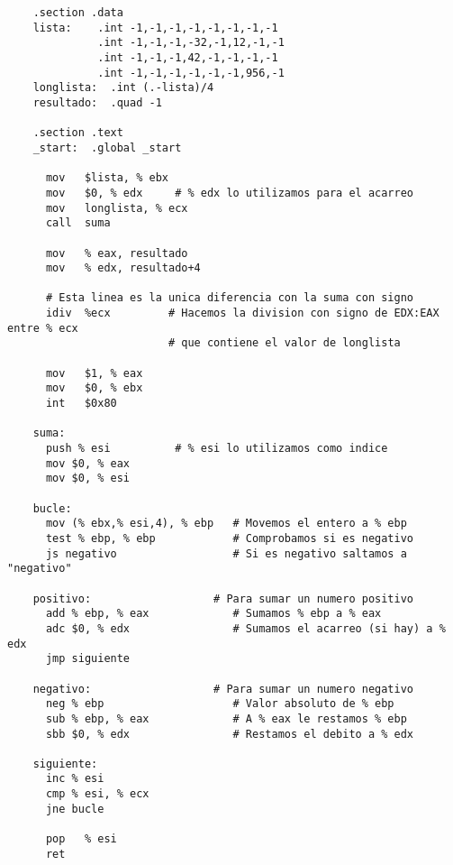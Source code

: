 \documentclass{article}
\begin{document}
  \begin{lstlisting}
    .section .data
    lista:    .int -1,-1,-1,-1,-1,-1,-1,-1
              .int -1,-1,-1,-32,-1,12,-1,-1
              .int -1,-1,-1,42,-1,-1,-1,-1
              .int -1,-1,-1,-1,-1,-1,956,-1
    longlista:	.int (.-lista)/4
    resultado:	.quad -1

    .section .text
    _start:  .global _start

      mov   $lista, % ebx
      mov   $0, % edx     # % edx lo utilizamos para el acarreo
      mov   longlista, % ecx
      call  suma

      mov   % eax, resultado
      mov   % edx, resultado+4

      # Esta linea es la unica diferencia con la suma con signo
      idiv  %ecx         # Hacemos la division con signo de EDX:EAX entre % ecx
                         # que contiene el valor de longlista

      mov   $1, % eax
      mov   $0, % ebx
      int   $0x80

    suma:
      push % esi          # % esi lo utilizamos como indice
      mov $0, % eax
      mov $0, % esi

    bucle:
      mov (% ebx,% esi,4), % ebp   # Movemos el entero a % ebp
      test % ebp, % ebp            # Comprobamos si es negativo
      js negativo                  # Si es negativo saltamos a "negativo"

    positivo:                   # Para sumar un numero positivo
      add % ebp, % eax             # Sumamos % ebp a % eax
      adc $0, % edx                # Sumamos el acarreo (si hay) a % edx
      jmp siguiente

    negativo:                   # Para sumar un numero negativo
      neg % ebp                    # Valor absoluto de % ebp
      sub % ebp, % eax             # A % eax le restamos % ebp
      sbb $0, % edx                # Restamos el debito a % edx

    siguiente:
      inc % esi
      cmp % esi, % ecx
      jne bucle

      pop   % esi
      ret
  \end{lstlisting}
\end{document}
